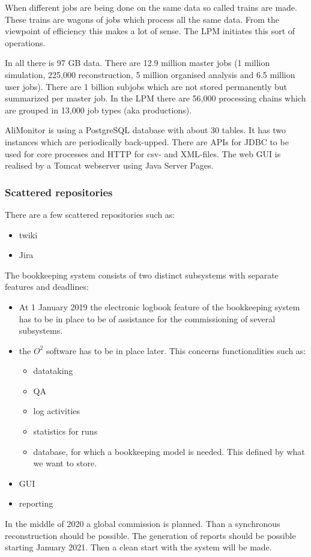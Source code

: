 When different jobs are being done on the same data so called trains are made. These trains are wagons of jobs which process all the same data. From the viewpoint of efficiency this makes a lot of sense. The LPM initiates this sort of operations.

In all there is 97 GB data. There are 12.9 million master jobs (1 million simulation, 225,000 reconstruction, 5 million organised analysis and 6.5 million user jobs). There are 1 billion subjobs which are not stored permanently but summarized per master job. In the LPM there are 56,000 processing chains which are grouped in 13,000 job types (aka productions).

AliMonitor is using a PostgreSQL database with about 30 tables. It has two instances which are periodically back-upped. There are APIs for JDBC to be used for core processes and HTTP for csv- and XML-files. The web GUI is realised by a Tomcat webserver using Java Server Pages.

\subsubsection{Scattered repositories}
There are a few scattered repositories such as:
\begin{itemize}
  \item twiki
  \item Jira
  
\end{itemize}



The bookkeeping system consists of two distinct subsystems with separate features and deadlines:
\begin{itemize}
  \item At 1 January 2019 the electronic logbook feature of the bookkeeping system has to be in place to be of assistance for the commissioning of several subsystems. 
  \item the $O^2$ software has to be in place later. This concerns functionalities such as:
  \begin{itemize}
    \item datataking
    \item QA
    \item log activities
    \item statistics for runs
    \item database, for which a bookkeeping model is needed. This defined by what we want to store.
  \end{itemize}
  \item GUI
  \item reporting
\end{itemize}
In the middle of 2020 a global commission is planned. Than a synchronous reconstruction should be possible. The generation of reports should be possible starting January 2021. Then a clean start with the system will be made.


